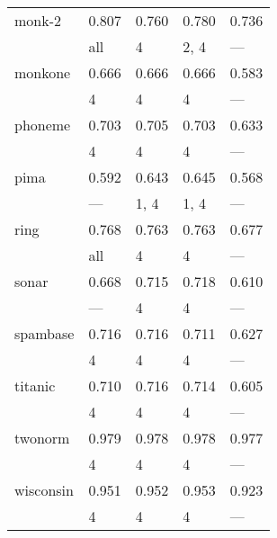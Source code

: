 \begin{tabular}{lllll}
 monk-2           & 0.807 & 0.760 & 0.780 & 0.736 \\
                  & all   & 4     & 2, 4  & ---   \\
 monkone          & 0.666 & 0.666 & 0.666 & 0.583 \\
                  & 4     & 4     & 4     & ---   \\
 phoneme          & 0.703 & 0.705 & 0.703 & 0.633 \\
                  & 4     & 4     & 4     & ---   \\
 pima             & 0.592 & 0.643 & 0.645 & 0.568 \\
                  & ---   & 1, 4  & 1, 4  & ---   \\
 ring             & 0.768 & 0.763 & 0.763 & 0.677 \\
                  & all   & 4     & 4     & ---   \\
 sonar            & 0.668 & 0.715 & 0.718 & 0.610 \\
                  & ---   & 4     & 4     & ---   \\
 spambase         & 0.716 & 0.716 & 0.711 & 0.627 \\
                  & 4     & 4     & 4     & ---   \\
 titanic          & 0.710 & 0.716 & 0.714 & 0.605 \\
                  & 4     & 4     & 4     & ---   \\
 twonorm          & 0.979 & 0.978 & 0.978 & 0.977 \\
                  & 4     & 4     & 4     & ---   \\
 wisconsin        & 0.951 & 0.952 & 0.953 & 0.923 \\
                  & 4     & 4     & 4     & ---   \\
\bottomrule
\end{tabular}
